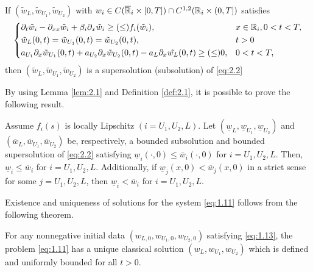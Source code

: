 \begin{definition}
    If \((\tilde{w}_L, \tilde{w}_{U_1}, \tilde{w}_{U_2})\) with \(w_i \in C(\overline{\mathbb{R}}_i \times [0, T]) \cap C^{1,2}(\mathbb{R}_i \times (0, T])\) satisfies 
    \begin{equation}
        \begin{dcases}
            \partial_t \tilde{w}_i - \partial_{xx} \tilde{w}_i + \beta_i \partial_x \tilde{w}_i \geq (\leq) f_i(\tilde{w}_i), & x \in \mathbb{R}_i, 0 < t < T, \\
            \tilde{w}_L(0, t) = \tilde{w}_{U_1}(0, t) = \tilde{w}_{U_2}(0, t), & t > 0 \\
            a_{U_1} \partial_x \tilde{w}_{U_1}(0, t) + a_{U_2} \partial_x \tilde{w}_{U_2}(0, t) - a_L \partial_x \tilde{w_L}(0, t) \geq (\leq) 0, & 0 < t < T, \\
        \end{dcases}
        \label{eq:2.2}
    \end{equation}
    then \((\tilde{w}_L, \tilde{w}_{U_1}, \tilde{w}_{U_2})\) is a supersolution (subsolution) of \ref{eq:2.2}
    \label{def:2.1}
\end{definition}

By using Lemma \ref{lem:2.1} and Definition \ref{def:2.1}, it is possible to prove the following result.

\begin{lemma}
    Assume \(f_i(s)\) is locally Lipschitz \((i = U_1, U_2, L)\). Let \((\underline{w}_L, \underline{w}_{U_1}, \underline{w}_{U_2})\) and \((\overline{w}_L, \overline{w}_{U_1}, \overline{w}_{U_2})\) be, respectively, a bounded subsolution and bounded supersolution of \ref{eq:2.2} satisfying \(\underline{w}_i(\cdot, 0) \leq \overline{w}_i(\cdot, 0)\) for \(i = U_1, U_2, L\). Then, \(\underline{w}_i \leq \overline{w}_i\) for \(i = U_1, U_2, L\). Additionally, if \(\underline{w}_j(x,0) < \overline{w}_j(x,0)\) in a strict sense for some \(j = U_1, U_2, L\), then \(\underline{w}_i < \overline{w}_i\) for \(i = U_1, U_2, L\).
    \label{lem:2.2} 
\end{lemma}
Existence and uniqueness of solutions for the system \ref{eq:1.11} follows from the following theorem.
\begin{theorem}
    For any nonnegative initial data \((w_{L,0}, w_{U_1,0}, w_{U_2,0})\) satisfying \eqref{eq:1.13}, the problem \eqref{eq:1.11} has a unique classical solution \((w_L, w_{U_1}, w_{U_2})\) which is defined and uniformly bounded for all \(t > 0\).
    \label{thm:2.4}
\end{theorem}


